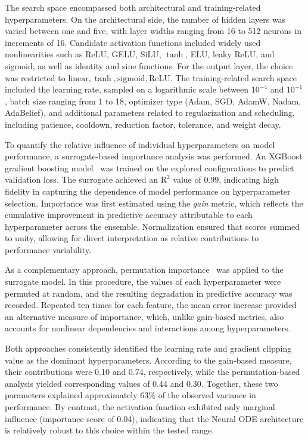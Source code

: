 \documentclass[lettersize,journal]{IEEEtran}
\begin{document}
The search space encompassed both architectural and training-related hyperparameters. On the architectural side, the number of hidden layers was varied between one and five, with layer widths ranging from 16 to 512 neurons in increments of 16. Candidate activation functions included widely used nonlinearities such as ReLU, GELU, SiLU, \(\tanh\), ELU, leaky ReLU, and sigmoid, as well as identity and sine functions. For the output layer, the choice was restricted to \({\text{linear}, \tanh, \text{sigmoid}, \text{ReLU}}\). The training-related search space included the learning rate, sampled on a logarithmic scale between \(10^{-4}\) and \(10^{-1}\), batch size ranging from 1 to 18, optimizer type (Adam, SGD, AdamW, Nadam, AdaBelief), and additional parameters related to regularization and scheduling, including patience, cooldown, reduction factor, tolerance, and weight decay.

To quantify the relative influence of individual hyperparameters on model performance, a surrogate-based importance analysis was performed. An XGBoost gradient boosting model~\cite{Chen2016} was trained on the explored configurations to predict validation loss. The surrogate achieved an \(\mathrm{R}^2\) value of 0.99, indicating high fidelity in capturing the dependence of model performance on hyperparameter selection. Importance was first estimated using the \emph{gain} metric, which reflects the cumulative improvement in predictive accuracy attributable to each hyperparameter across the ensemble. Normalization ensured that scores summed to unity, allowing for direct interpretation as relative contributions to performance variability.

As a complementary approach, permutation importance~\cite{Altmann2010} was applied to the surrogate model. In this procedure, the values of each hyperparameter were permuted at random, and the resulting degradation in predictive accuracy was recorded. Repeated ten times for each feature, the mean error increase provided an alternative measure of importance, which, unlike gain-based metrics, also accounts for nonlinear dependencies and interactions among hyperparameters.

Both approaches consistently identified the learning rate and gradient clipping value as the dominant hyperparameters. According to the gain-based measure, their contributions were 0.10 and 0.74, respectively, while the permutation-based analysis yielded corresponding values of 0.44 and 0.30. Together, these two parameters explained approximately 63\% of the observed variance in performance. By contrast, the activation function exhibited only marginal influence (importance score of 0.04), indicating that the Neural ODE architecture is relatively robust to this choice within the tested range.
\end{document}
